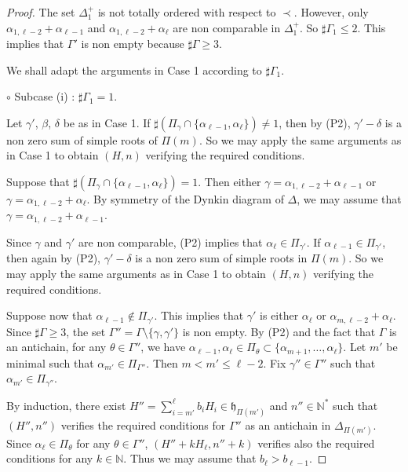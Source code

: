\documentclass{amsart}
\theoremstyle{definition}
\theoremstyle{remark}
\numberwithin{equation}{section}
\begin{document}
\begin{proof}
The set $\Delta_{1}^{+}$ is not totally ordered
with respect to $\prec$. However, only $\alpha_{1,\ell-2} + \alpha_{\ell-1}$ 
and $\alpha_{1,\ell-2} + \alpha_{\ell}$ are non comparable in $\Delta_{1}^{+}$. So 
$\sharp \Gamma_{1} \leqslant 2$. This implies that $\Gamma'$ is non empty
because $\sharp \Gamma\geqslant 3$.

We shall adapt the arguments in Case 1 according to $\sharp\Gamma_{1}$.
\smallskip

\noindent $\circ$ Subcase (i) : $\sharp \Gamma_{1} = 1$. 
\smallskip

Let $\gamma'$, $\beta$, $\delta$ be as in Case 1.
If $\sharp (\Pi_{\gamma}\cap \{ \alpha_{\ell-1},\alpha_{\ell}\} ) \neq 1$, then by (P2),
$\gamma'-\delta$ is a non zero sum of simple roots of $\Pi (m)$. So we may apply 
the same arguments as in Case 1 to obtain $(H,n)$ verifying the required conditions.

Suppose that $\sharp (\Pi_{\gamma}\cap \{ \alpha_{\ell-1},\alpha_{\ell}\} ) = 1$.
Then either $\gamma = \alpha_{1,\ell-2}+\alpha_{\ell-1}$ or 
$\gamma = \alpha_{1,\ell-2}+\alpha_{\ell}$. By symmetry of the Dynkin diagram of $\Delta$,  
we may assume that $\gamma = \alpha_{1,\ell-2}+\alpha_{\ell-1}$. 

Since $\gamma$ and $\gamma'$ are non comparable, (P2) implies that 
$\alpha_{\ell} \in \Pi_{\gamma'}$. If $\alpha_{\ell-1} \in \Pi_{\gamma'}$, then
again by (P2), $\gamma' - \delta$ is a non zero sum of simple roots in $\Pi (m)$. So
we may apply the same arguments as in Case 1 to obtain $(H,n)$ 
verifying the required conditions.

Suppose now that $\alpha_{\ell-1} \not\in \Pi_{\gamma'}$. This implies 
that $\gamma'$ is either $\alpha_{\ell}$ or $\alpha_{m,\ell-2} + \alpha_{\ell}$.
Since $\sharp \Gamma \geqslant 3$, the set $\Gamma'' = \Gamma \setminus 
\{ \gamma , \gamma' \}$ is non empty. By (P2) and the fact that $\Gamma$ is an antichain,
for any $\theta\in \Gamma''$, we have $\alpha_{\ell-1},\alpha_{\ell} \in  
\Pi_{\theta} \subset \{ \alpha_{m+1},\dots , \alpha_{\ell}\}$. Let $m'$ be minimal such that 
$\alpha_{m'} \in\Pi_{\Gamma''}$. Then $m < m' \leqslant \ell-2$. Fix 
$\gamma'' \in \Gamma''$ such that $\alpha_{m'} \in \Pi_{\gamma''}$.

By induction, there exist $H'' = \sum_{i=m'}^{\ell} b_{i}H_{i} \in \mathfrak{h}_{\Pi(m')}$
and $n'' \in \mathbb{N}^{*}$ such that $(H'',n'')$ verifies the required conditions for $\Gamma''$
as an antichain in $\Delta_{\Pi(m')}$. Since 
$\alpha_{\ell} \in  \Pi_{\theta}$ for any $\theta \in \Gamma''$, $(H'' + k H_{\ell} , n'' + k )$ verifies also
the required conditions for any $k\in \mathbb{N}$. Thus
we may assume that $b_{\ell} > b_{\ell-1}$.  


\end{proof}
\end{document}
